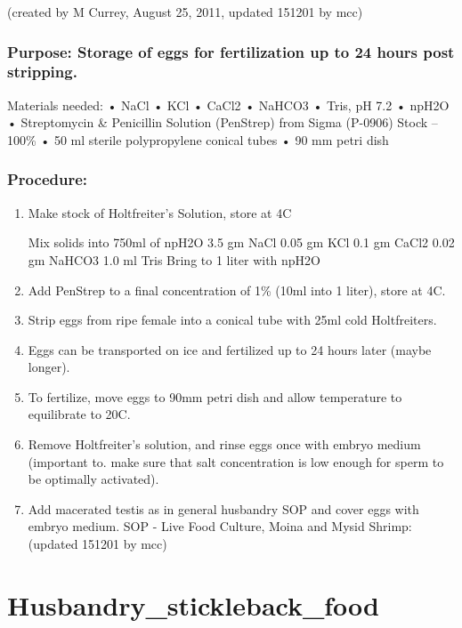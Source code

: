 \documentclass[
]{book}
\begin{document}
(created by M Currey, August 25, 2011, updated 151201 by mcc)

\hypertarget{purpose-storage-of-eggs-for-fertilization-up-to-24-hours-post-stripping.}{%
\subsection{Purpose: Storage of eggs for fertilization up to 24 hours post stripping.}\label{purpose-storage-of-eggs-for-fertilization-up-to-24-hours-post-stripping.}}

Materials needed:
• NaCl
• KCl
• CaCl2
• NaHCO3
• Tris, pH 7.2
• npH2O
• Streptomycin \& Penicillin Solution (PenStrep) from Sigma (P-0906) Stock -- 100\%
• 50 ml sterile polypropylene conical tubes
• 90 mm petri dish

\hypertarget{procedure-2}{%
\subsection{Procedure:}\label{procedure-2}}

\begin{enumerate}
\def\labelenumi{\arabic{enumi}.}
\item
  Make stock of Holtfreiter's Solution, store at 4C

  Mix solids into 750ml of npH2O
  3.5 gm NaCl
  0.05 gm KCl
  0.1 gm CaCl2
  0.02 gm NaHCO3
  1.0 ml Tris
  Bring to 1 liter with npH2O
\item
  Add PenStrep to a final concentration of 1\% (10ml into 1 liter), store at 4C.
\item
  Strip eggs from ripe female into a conical tube with 25ml cold Holtfreiters.
\item
  Eggs can be transported on ice and fertilized up to 24 hours later (maybe longer).
\item
  To fertilize, move eggs to 90mm petri dish and allow temperature to equilibrate to 20C.
\item
  Remove Holtfreiter's solution, and rinse eggs once with embryo medium (important to.
  make sure that salt concentration is low enough for sperm to be optimally activated).
\item
  Add macerated testis as in general husbandry SOP and cover eggs with embryo medium.
  SOP - Live Food Culture, Moina and Mysid Shrimp:
  (updated 151201 by mcc)
\end{enumerate}

\hypertarget{husbandry_stickleback_food}{%
\chapter{Husbandry\_stickleback\_food}\label{husbandry_stickleback_food}}
\end{document}
